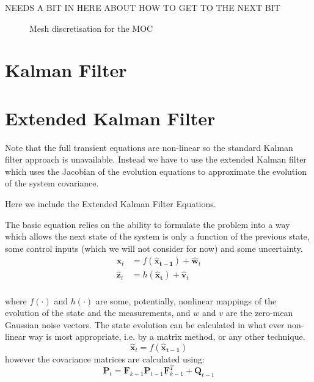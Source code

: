 \documentclass[]{article}
\begin{document}
NEEDS A BIT IN HERE ABOUT HOW TO GET TO THE NEXT BIT

\begin{figure}[htp]
 \centering
 \caption{Mesh discretisation for the MOC}
 \label{MOCmesh}
\end{figure}



\section{Kalman Filter}

\section{Extended Kalman Filter}
Note that the full transient equations are non-linear so the standard Kalman filter approach is unavailable. 
Instead we have to use the extended Kalman filter which uses the Jacobian of the evolution equations to approximate the evolution of the system covariance. 


Here we include the Extended Kalman Filter Equations. 

The basic equation relies on the ability to formulate the problem into a way which allows the next state of the system is only a function of the previous state, some control inputs (which we will not consider for now) and some uncertainty.
\begin{equation}
\begin{split}
 \mathbf{\hat{x}}_t &= f(\mathbf{\hat{x}_{t-1}}) + \mathbf{\hat{w}}_t \\
 \mathbf{\hat{z}}_t &= h(\mathbf{\hat{x}_t}) + \mathbf{\hat{v}}_t \\
\end{split}
\end{equation}

where $f(\cdot)$ and $h(\cdot)$ are some, potentially, nonlinear mappings of the evolution of the state and the measurements, and $w$ and $v$ are the zero-mean Gaussian noise vectors. 
The state evolution can be calculated in what ever non-linear way is most appropriate, i.e. by a matrix method, or any other technique. 
\begin{equation}
 \mathbf{\hat{x}}_t = f(\mathbf{\hat{x}_{t-1}})
\end{equation}
however the covariance matrices are calculated using:
\begin{equation}
 \mathbf{P}_t = \mathbf{F}_{k-1} \mathbf{P}_{t-1} \mathbf{F}_{k-1}^T + \mathbf{Q}_{t-1}
\end{equation}
\end{document}
